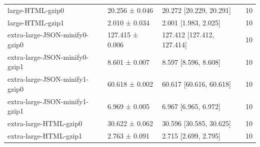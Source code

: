 \begin{tabular}{lllr}
large-HTML-gzip0 & 20.256 ± 0.046 & 20.272 [20.229, 20.291] & 10 \\
large-HTML-gzip1 & 2.010 ± 0.034 & 2.001 [1.983, 2.025] & 10 \\
extra-large-JSON-minify0-gzip0 & 127.415 ± 0.006 & 127.412 [127.412, 127.414] & 10 \\
extra-large-JSON-minify0-gzip1 & 8.601 ± 0.007 & 8.597 [8.596, 8.608] & 10 \\
extra-large-JSON-minify1-gzip0 & 60.618 ± 0.002 & 60.617 [60.616, 60.618] & 10 \\
extra-large-JSON-minify1-gzip1 & 6.969 ± 0.005 & 6.967 [6.965, 6.972] & 10 \\
extra-large-HTML-gzip0 & 30.622 ± 0.062 & 30.596 [30.585, 30.625] & 10 \\
extra-large-HTML-gzip1 & 2.763 ± 0.091 & 2.715 [2.699, 2.795] & 10 \\
\bottomrule
\end{tabular}
